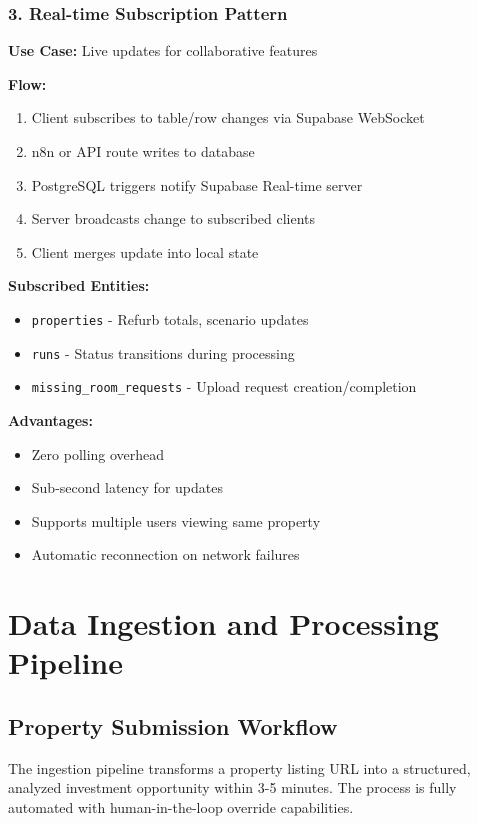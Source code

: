 \documentclass[11pt,a4paper]{article}
\begin{document}
\subsubsection{3. Real-time Subscription Pattern}

\textbf{Use Case:} Live updates for collaborative features

\textbf{Flow:}
\begin{enumerate}
  \item Client subscribes to table/row changes via Supabase WebSocket
  \item n8n or API route writes to database
  \item PostgreSQL triggers notify Supabase Real-time server
  \item Server broadcasts change to subscribed clients
  \item Client merges update into local state
\end{enumerate}

\textbf{Subscribed Entities:}
\begin{itemize}
  \item \texttt{properties} - Refurb totals, scenario updates
  \item \texttt{runs} - Status transitions during processing
  \item \texttt{missing\_room\_requests} - Upload request creation/completion
\end{itemize}

\textbf{Advantages:}
\begin{itemize}
  \item Zero polling overhead
  \item Sub-second latency for updates
  \item Supports multiple users viewing same property
  \item Automatic reconnection on network failures
\end{itemize}

\section{Data Ingestion and Processing Pipeline}

\subsection{Property Submission Workflow}

The ingestion pipeline transforms a property listing URL into a structured, analyzed investment opportunity within 3-5 minutes. The process is fully automated with human-in-the-loop override capabilities.
\end{document}
